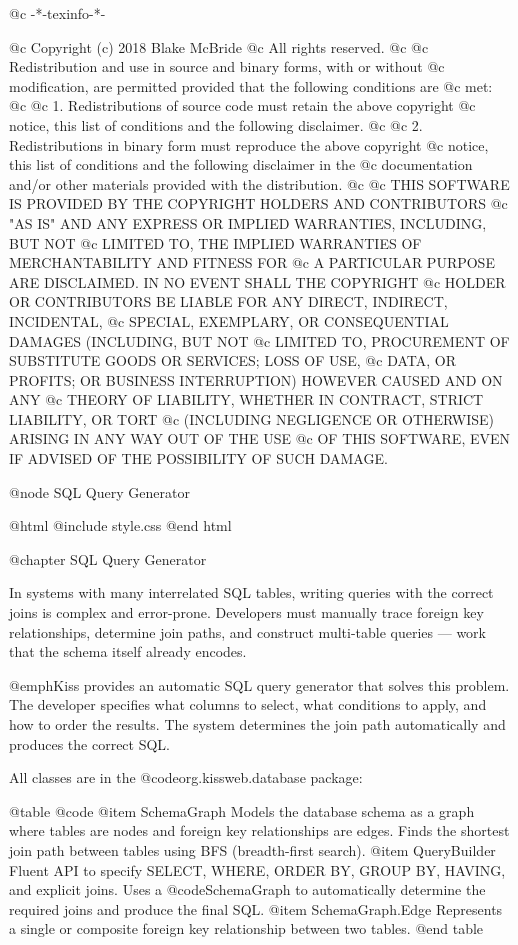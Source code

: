 @c -*-texinfo-*-

@c  Copyright (c) 2018 Blake McBride
@c  All rights reserved.
@c
@c  Redistribution and use in source and binary forms, with or without
@c  modification, are permitted provided that the following conditions are
@c  met:
@c
@c  1. Redistributions of source code must retain the above copyright
@c  notice, this list of conditions and the following disclaimer.
@c
@c  2. Redistributions in binary form must reproduce the above copyright
@c  notice, this list of conditions and the following disclaimer in the
@c  documentation and/or other materials provided with the distribution.
@c
@c  THIS SOFTWARE IS PROVIDED BY THE COPYRIGHT HOLDERS AND CONTRIBUTORS
@c  "AS IS" AND ANY EXPRESS OR IMPLIED WARRANTIES, INCLUDING, BUT NOT
@c  LIMITED TO, THE IMPLIED WARRANTIES OF MERCHANTABILITY AND FITNESS FOR
@c  A PARTICULAR PURPOSE ARE DISCLAIMED. IN NO EVENT SHALL THE COPYRIGHT
@c  HOLDER OR CONTRIBUTORS BE LIABLE FOR ANY DIRECT, INDIRECT, INCIDENTAL,
@c  SPECIAL, EXEMPLARY, OR CONSEQUENTIAL DAMAGES (INCLUDING, BUT NOT
@c  LIMITED TO, PROCUREMENT OF SUBSTITUTE GOODS OR SERVICES; LOSS OF USE,
@c  DATA, OR PROFITS; OR BUSINESS INTERRUPTION) HOWEVER CAUSED AND ON ANY
@c  THEORY OF LIABILITY, WHETHER IN CONTRACT, STRICT LIABILITY, OR TORT
@c  (INCLUDING NEGLIGENCE OR OTHERWISE) ARISING IN ANY WAY OUT OF THE USE
@c  OF THIS SOFTWARE, EVEN IF ADVISED OF THE POSSIBILITY OF SUCH DAMAGE.

@node SQL Query Generator

@html
@include style.css
@end html

@chapter SQL Query Generator

In systems with many interrelated SQL tables, writing queries with the
correct joins is complex and error-prone.  Developers must manually
trace foreign key relationships, determine join paths, and construct
multi-table queries --- work that the schema itself already encodes.

@emph{Kiss} provides an automatic SQL query generator that solves this
problem.  The developer specifies what columns to select, what
conditions to apply, and how to order the results.  The system
determines the join path automatically and produces the correct SQL.

All classes are in the @code{org.kissweb.database} package:

@table @code
@item SchemaGraph
Models the database schema as a graph where tables are nodes and
foreign key relationships are edges.  Finds the shortest join path
between tables using BFS (breadth-first search).
@item QueryBuilder
Fluent API to specify SELECT, WHERE, ORDER BY, GROUP BY, HAVING, and
explicit joins.  Uses a @code{SchemaGraph} to automatically determine the
required joins and produce the final SQL.
@item SchemaGraph.Edge
Represents a single or composite foreign key relationship between two
tables.
@end table

